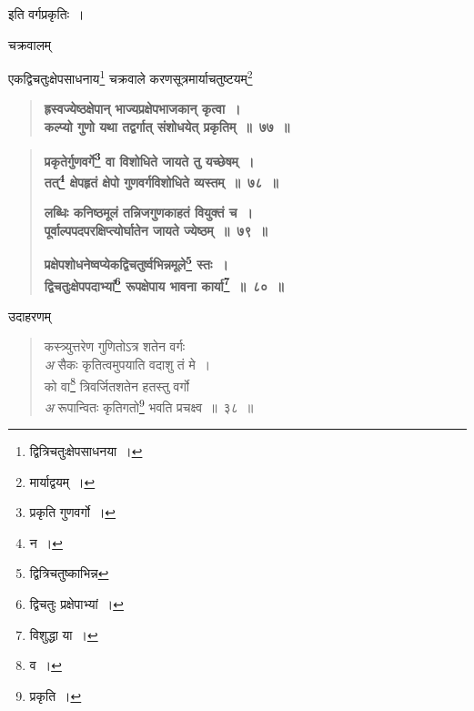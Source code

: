 \documentclass[11pt, openany]{book}
\begin{document}
\begin{center}
इति वर्गप्रकृतिः~। 
\vspace{4mm}

 \label{cak}
चक्रवालम् 
\end{center}

एकद्विचतुःक्षेपसाधनाय\renewcommand{\thefootnote}{१०}\footnote{द्वित्रिचतुःक्षेपसाधनया~।} चक्रवाले करणसूत्रमार्याचतुष्टयम्\renewcommand{\thefootnote}{११}\footnote{मार्याद्वयम्~।} \textendash 

 \label{77}
\begin{quote}
\textbf{{\color{purple}ह्रस्वज्येष्ठक्षेपान् भाज्यप्रक्षेपभाजकान् कृत्वा~। \\
कल्प्यो गुणो यथा तद्वर्गात् संशोधयेत् प्रकृतिम्~॥~७७~॥}}
\end{quote}

\newpage

 \label{78}
\begin{quote}
\textbf{{\color{purple}प्रकृतेर्गुणवर्गे\renewcommand{\thefootnote}{१}\footnote{प्रकृति गुणवर्गो~।} वा विशोधिते जायते तु यच्छेषम्~। \\
तत्\renewcommand{\thefootnote}{२}\footnote{न~।} क्षेपहृतं क्षेपो गुणवर्गविशोधिते व्यस्तम्~॥~७८~॥}}
\vspace{1mm}

\textbf{{\color{purple}लब्धिः कनिष्ठमूलं तन्निजगुणकाहतं वियुक्तं च~। \\
पूर्वाल्पपदपरक्षिप्त्योर्घातेन जायते ज्येष्ठम्~॥~७९~॥}}
\vspace{1mm}

\textbf{{\color{purple}प्रक्षेपशोधनेष्वप्येकद्विचतुर्ष्वभिन्नमूले\renewcommand{\thefootnote}{३}\footnote{द्वित्रिचतुष्काभिन्न} स्तः~। \\
द्विचतुःक्षेपपदाभ्यां\renewcommand{\thefootnote}{४}\footnote{द्विचतुः प्रक्षेपाभ्यां~।} रूपक्षेपाय भावना कार्या\renewcommand{\thefootnote}{५}\footnote{विशुद्धा या~।}~॥~८०~॥}}
\end{quote}

उदाहरणम् \textendash 

\begin{quote}
{\color{red}कस्त्र्युत्तरेण गुणितोऽत्र शतेन वर्गः \\
\emph{\color{white}अ} \hspace{2mm} सैकः कृतित्वमुपयाति वदाशु तं मे~। \\
को वा\renewcommand{\thefootnote}{६}\footnote{व~।} त्रिवर्जितशतेन हतस्तु वर्गो \\
\emph{\color{white}अ} \hspace{2mm} रूपान्वितः कृतिगतो\renewcommand{\thefootnote}{७}\footnote{प्रकृति~।} भवति प्रचक्ष्व~॥~३८~॥}
\end{quote}
\end{document}
